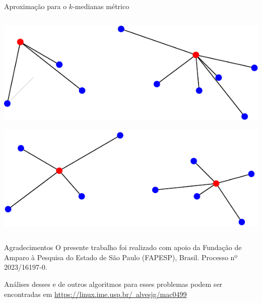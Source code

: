 \documentclass[final]{beamer}
\begin{document}
\begin{frame}[t]
\begin{columns}[t]
\begin{column}{0.47\paperwidth}
\begin{block}{Aproximação para o $k$-medianas métrico}
\begin{columns}
         \begin{column}{0.23\paperwidth}
          \begin{tcolorbox}
            \includegraphics[scale=1.2]{imgs/local-search3.pdf}
          \end{tcolorbox}

          \begin{tcolorbox}
            \includegraphics[scale=1.2]{imgs/local-search5.pdf}
          \end{tcolorbox}
        \end{column}
      \end{columns}

\end{block}

\begin{block}{Agradecimentos}
  O presente trabalho foi realizado com apoio da Fundação de Amparo à Pesquisa do Estado de São Paulo (FAPESP), Brasil. Processo nº 2023/16197-0.

  Análises desses e de outros algoritmos para esses problemas podem ser encontradas em \href{https://linux.ime.usp.br/~alvesjg/mac0499/}{https://linux.ime.usp.br/~alvesjg/mac0499}
  

\end{block}
\end{column}
\end{columns}
\end{frame}
\end{document}

